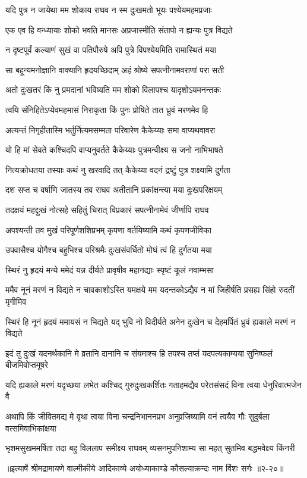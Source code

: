 \twolineshloka
{यदि पुत्र न जायेथा मम शोकाय राघव}
{न स्म दुःखमतो भूयः पश्येयमहमप्रजाः} %

\twolineshloka
{एक एव हि वन्ध्यायाः शोको भवति मानसः}
{अप्रजास्मीति संतापो न ह्यन्यः पुत्र विद्यते} %

\twolineshloka
{न दृष्टपूर्वं कल्याणं सुखं वा पतिपौरुषे}
{अपि पुत्रे विपश्येयमिति रामास्थितं मया} %

\twolineshloka
{सा बहून्यमनोज्ञानि वाक्यानि हृदयच्छिदाम्}
{अहं श्रोष्ये सपत्नीनामवराणां परा सती} %

\twolineshloka
{अतो दुःखतरं किं नु प्रमदानां भविष्यति}
{मम शोको विलापश्च यादृशोऽयमनन्तकः} %

\twolineshloka
{त्वयि संनिहितेऽप्येवमहमासं निराकृता}
{किं पुनः प्रोषिते तात ध्रुवं मरणमेव हि} %

\twolineshloka
{अत्यन्तं निगृहीतास्मि भर्तुर्नित्यमसम्मता}
{परिवारेण कैकेय्याः समा वाप्यथवावरा} %

\twolineshloka
{यो हि मां सेवते कश्चिदपि वाप्यनुवर्तते}
{कैकेय्याः पुत्रमन्वीक्ष्य स जनो नाभिभाषते} %

\twolineshloka
{नित्यक्रोधतया तस्याः कथं नु खरवादि तत्}
{कैकेय्या वदनं द्रष्टुं पुत्र शक्ष्यामि दुर्गता} %

\twolineshloka
{दश सप्त च वर्षाणि जातस्य तव राघव}
{अतीतानि प्रकांक्षन्त्या मया दुःखपरिक्षयम्} %

\twolineshloka
{तदक्षयं महद्दुःखं नोत्सहे सहितुं चिरात्}
{विप्रकारं सपत्नीनामेवं जीर्णापि राघव} %

\twolineshloka
{अपश्यन्ती तव मुखं परिपूर्णशशिप्रभम्}
{कृपणा वर्तयिष्यामि कथं कृपणजीविका} %

\twolineshloka
{उपवासैश्च योगैश्च बहुभिश्च परिश्रमैः}
{दुःखसंवर्धितो मोघं त्वं हि दुर्गतया मया} %

\twolineshloka
{स्थिरं नु हृदयं मन्ये ममेदं यन्न दीर्यते}
{प्रावृषीव महानद्याः स्पृष्टं कूलं नवाम्भसा} %

\twolineshloka
{ममैव नूनं मरणं न विद्यते न चावकाशोऽस्ति यमक्षये मम}
{यदन्तकोऽद्यैव न मां जिहीर्षति प्रसह्य सिंहो रुदतीं मृगीमिव} %

\twolineshloka
{स्थिरं हि नूनं हृदयं ममायसं न भिद्यते यद् भुवि नो विदीर्यते}
{अनेन दुःखेन च देहमर्पितं ध्रुवं ह्यकाले मरणं न विद्यते} %

\twolineshloka
{इदं तु दुःखं यदनर्थकानि मे व्रतानि दानानि च संयमाश्च हि}
{तपश्च तप्तं यदपत्यकाम्यया सुनिष्फलं बीजमिवोप्तमूषरे} %

\twolineshloka
{यदि ह्यकाले मरणं यदृच्छया लभेत कश्चिद् गुरुदुःखकर्शितः}
{गताहमद्यैव परेतसंसदं विना त्वया धेनुरिवात्मजेन वै} %

\twolineshloka
{अथापि किं जीवितमद्य मे वृथा त्वया विना चन्द्रनिभाननप्रभ}
{अनुव्रजिष्यामि वनं त्वयैव गौः सुदुर्बला वत्समिवाभिकांक्षया} %

\twolineshloka
{भृशमसुखममर्षिता तदा बहु विललाप समीक्ष्य राघवम्}
{व्यसनमुपनिशाम्य सा महत् सुतमिव बद्धमवेक्ष्य किंनरी} %


॥इत्यार्षे श्रीमद्रामायणे वाल्मीकीये आदिकाव्ये अयोध्याकाण्डे कौसल्याक्रन्दः नाम विंशः सर्गः ॥२-२०॥

